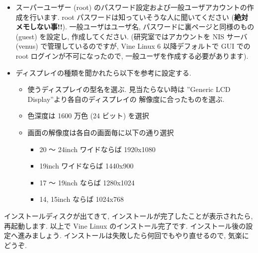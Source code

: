 \documentclass{jarticle}
\begin{document}
\begin{itemize}
	\item スーパーユーザー (root) のパスワード設定および一般ユーザアカウントの作成を行います.
	      root パスワードは知っていそうな人に聞いてください ({\bf 絶対メモしない事!!}).
	      一般ユーザはユーザ名, パスワードに裏ページと同様のもの (guest) を設定し, 作成してください.
	      (研究室ではアカウントを NIS サーバ (venus) で管理しているのですが, Vine Linux 6 以降デフォルトで
	      GUI での root ログインが不可になったので, 一般ユーザを作成する必要があります).
	\item ディスプレイの種類を聞かれたら以下を参考に設定する.
		\begin{itemize}
			\item 使うディスプレイの型名を選ぶ. 見当たらない時は
			      ''Generic LCD Display''より各自のディスプレイの
			      解像度に合ったものを選ぶ.
			\item 色深度は 1600 万色 (24 ビット) を選択
			\item 画面の解像度は各自の画面毎に以下の通り選択
			\begin{itemize}
				\item 20 〜 24inch ワイドならば 1920x1080
				\item 19inch ワイドならば 1440x900
				\item 17 〜 19inch ならば 1280x1024
				\item 14, 15inch ならば 1024x768
			\end{itemize}
		\end{itemize}
\end{itemize}

インストールディスクが出てきて, インストールが完了したことが表示されたら, 再起動します.
以上で Vine Linux のインストール完了です. インストール後の設定へ進みましょう.
インストールは失敗したら何回でもやり直せるので, 気楽にどうぞ.

%
\end{document}
